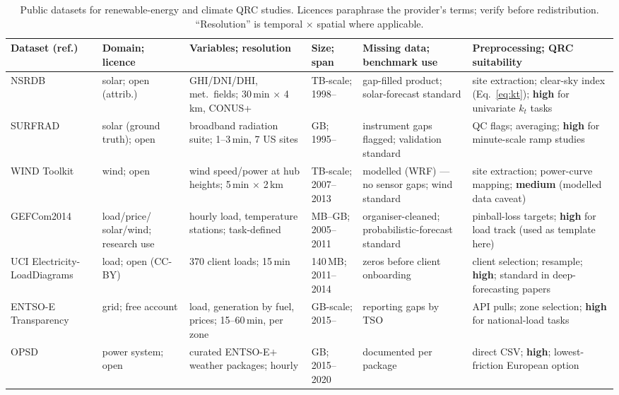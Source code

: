 \begin{table}[tp]
\centering\scriptsize
\caption{Public datasets for renewable-energy and climate QRC studies.
Licences paraphrase the provider's terms; verify before redistribution.
``Resolution'' is temporal $\times$ spatial where applicable.}
\label{tab:datasets}
\setlength{\tabcolsep}{3pt}
\begin{tabular}{@{}p{2.5cm}p{1.5cm}p{3.1cm}p{2.2cm}p{2.3cm}p{3.4cm}@{}}
\toprule
Dataset (ref.) & Domain; licence & Variables; resolution & Size; span & Missing data; benchmark use & Preprocessing; QRC suitability \\
\midrule
NSRDB \citep{sengupta2018nsrdb} & solar; open (attrib.) & GHI/DNI/DHI, met.\ fields; 30\,min $\times$ 4\,km, CONUS+ & TB-scale; 1998-- & gap-filled product; solar-forecast standard & site extraction; clear-sky index (Eq.~\ref{eq:kt}); \textbf{high} for univariate $k_t$ tasks \\
SURFRAD \citep{augustine2000surfrad} & solar (ground truth); open & broadband radiation suite; 1--3\,min, 7 US sites & GB; 1995-- & instrument gaps flagged; validation standard & QC flags; averaging; \textbf{high} for minute-scale ramp studies \\
WIND Toolkit \citep{draxl2015wind} & wind; open & wind speed/power at hub heights; 5\,min $\times$ 2\,km & TB-scale; 2007--2013 & modelled (WRF) --- no sensor gaps; wind standard & site extraction; power-curve mapping; \textbf{medium} (modelled data caveat) \\
GEFCom2014 \citep{hong2016gefcom} & load/price/ solar/wind; research use & hourly load, temperature stations; task-defined & MB--GB; 2005--2011 & organiser-cleaned; probabilistic-forecast standard & pinball-loss targets; \textbf{high} for load track (used as template here) \\
UCI Electricity- LoadDiagrams \citep{trindade2015electricity} & load; open (CC-BY) & 370 client loads; 15\,min & 140\,MB; 2011--2014 & zeros before client onboarding & client selection; resample; \textbf{high}; standard in deep-forecasting papers \\
ENTSO-E Transparency \citep{hirth2018entsoe} & grid; free account & load, generation by fuel, prices; 15--60\,min, per zone & GB-scale; 2015-- & reporting gaps by TSO & API pulls; zone selection; \textbf{high} for national-load tasks \\
OPSD \citep{wiese2019open} & power system; open & curated ENTSO-E$+$weather packages; hourly & GB; 2015--2020 & documented per package & direct CSV; \textbf{high}; lowest-friction European option \\

\end{tabular}
\end{table}
